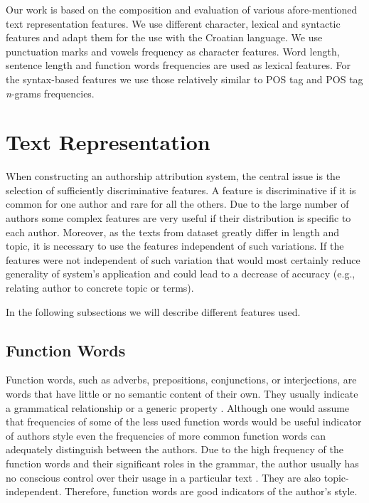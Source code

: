 \documentclass{llncs}
\begin{document}
Our work is based on the composition and evaluation of various afore-mentioned
text representation features. We use different character, lexical and syntactic
features and adapt them for the use with the Croatian language. We use
punctuation marks and vowels frequency as character features. Word length,
sentence length and function words frequencies are used as lexical features. For
the syntax-based features we use those relatively similar to POS tag and POS tag
\emph{n}-grams frequencies.


\section{Text Representation}
When constructing an authorship attribution system, the central issue is the
selection of sufficiently discriminative features. A feature is discriminative if
it is common for one author and rare for all the others. Due to the large number
of authors some complex features are very useful if their distribution is
specific to each author. Moreover, as the texts from dataset greatly differ in
length and topic, it is necessary to use the features independent of such
variations. If the features were not independent of such variation that
would most certainly reduce generality of system's application and could lead
to a decrease of accuracy (e.g., relating author to concrete topic or terms).

In the following subsections we will describe different features used.

\subsection{Function Words}
\label{sec:funkcijske-rijeci}
Function words, such as adverbs, prepositions, conjunctions, or interjections,
are words that have little or no semantic content of their own. They usually
indicate a grammatical relationship or a generic property
\cite{zhao2005effective}. Although one would assume that frequencies of some of
the less used function words would be useful indicator of authors style even the
frequencies of more common function words can adequately distinguish between the
authors. Due to the high frequency of the function words and their significant
roles in the grammar, the author usually has no conscious control over their
usage in a particular text \cite{argamon2005measuring}. They are also
topic-independent. Therefore, function words are good indicators of the author's
style.
\end{document}
